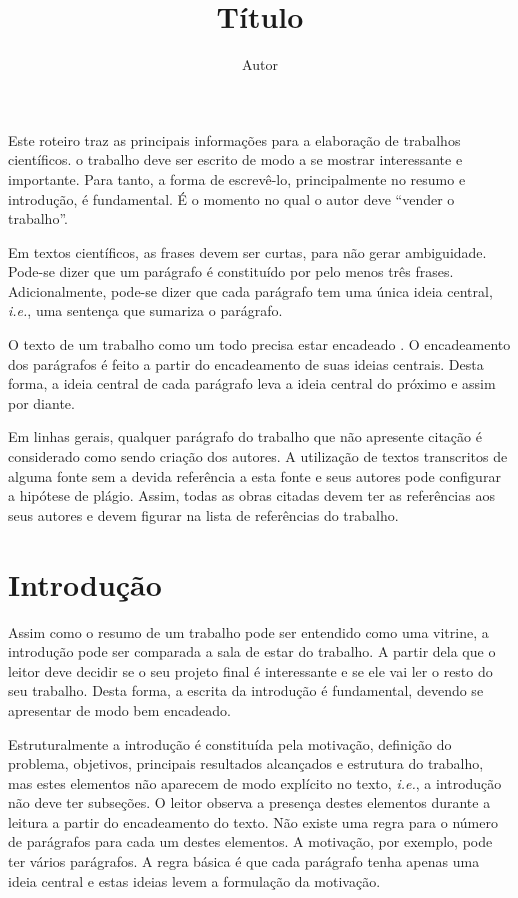 \documentclass[12pt]{article}
\title{Título}
\author{Autor\inst{1}}
\begin{document}
 
	
	\maketitle
	
	\begin{resumo} 
		Este roteiro traz as principais informações para a elaboração de trabalhos científicos. o trabalho deve ser escrito de modo a se mostrar interessante e importante. Para tanto, a forma de escrevê-lo, principalmente no resumo e  introdução, é fundamental. É o momento no qual o autor deve ``vender o trabalho''. 
		
		Em textos científicos, as frases devem ser curtas, para não gerar ambiguidade. Pode-se dizer que um parágrafo é constituído por pelo menos três frases. Adicionalmente, pode-se dizer que cada parágrafo tem uma única ideia central, \emph{i.e.}, uma sentença  que sumariza o parágrafo. 
		
		O texto de um trabalho como um todo precisa estar encadeado \citep{zobel_writing_2015}. O encadeamento dos parágrafos é feito a partir do encadeamento de suas ideias centrais. Desta forma, a ideia central de cada parágrafo leva a ideia central do próximo e assim por diante. 
		
		Em linhas gerais, qualquer parágrafo do trabalho que não apresente citação é considerado como sendo criação dos autores. A utilização de textos transcritos de alguma fonte sem a devida referência a esta fonte e seus autores pode configurar a hipótese de plágio. Assim, todas as obras citadas devem ter as referências aos seus autores e devem figurar na lista de referências do trabalho.
	\end{resumo}
	
	\section{Introdução}
	\label{sec:introducao}
	
	Assim como o resumo de um trabalho pode ser entendido como uma vitrine, a introdução pode ser comparada a sala de estar do trabalho. A partir dela que o leitor deve decidir se o seu projeto final é interessante e se ele vai ler o resto do seu trabalho. Desta forma, a escrita da introdução é fundamental, devendo se apresentar de modo bem encadeado. 
	
	Estruturalmente a introdução é constituída pela motivação, definição do problema, objetivos, principais resultados alcançados e estrutura do trabalho, mas estes elementos não aparecem de modo explícito no texto, \emph{i.e.}, a introdução não deve ter subseções. O leitor observa a presença destes elementos durante a leitura a partir do encadeamento do texto. Não existe uma regra para o número de parágrafos para cada um destes elementos. A motivação, por exemplo, pode ter vários parágrafos. A regra básica é que cada parágrafo tenha apenas uma ideia central e estas ideias levem a formulação da motivação. 
	
\end{document}
